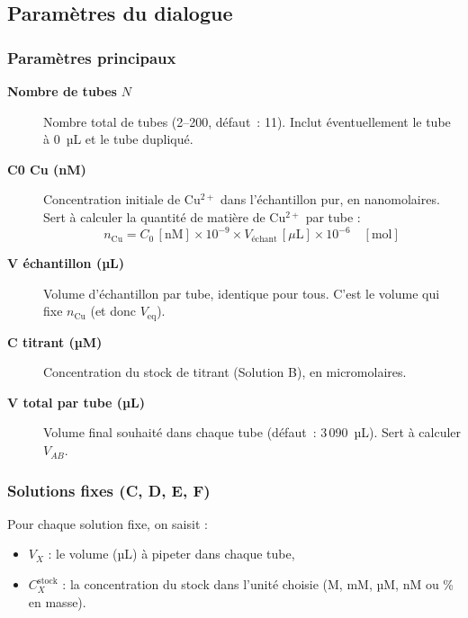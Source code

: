 \documentclass[12pt, a4paper]{article}
\begin{document}
\subsection{Paramètres du dialogue}

\subsubsection{Paramètres principaux}

\begin{description}
  \item[\textbf{Nombre de tubes} $N$] Nombre total de tubes (2--200,
        défaut~: 11). Inclut éventuellement le tube à 0~µL et le tube
        dupliqué.

  \item[\textbf{C0 Cu (nM)}] Concentration initiale de Cu$^{2+}$ dans
        l'échantillon pur, en nanomolaires. Sert à calculer la quantité de
        matière de Cu$^{2+}$ par tube :
        \[
          n_\text{Cu} = C_0\,[\text{nM}] \times 10^{-9} \times
                        V_\text{échant}\,[\mu\text{L}] \times 10^{-6}
                      \quad [\text{mol}]
        \]

  \item[\textbf{V échantillon (µL)}] Volume d'échantillon par tube,
        identique pour tous. C'est le volume qui fixe $n_\text{Cu}$
        (et donc $V_\text{eq}$).

  \item[\textbf{C titrant (µM)}] Concentration du stock de titrant
        (Solution B), en micromolaires.

  \item[\textbf{V total par tube (µL)}] Volume final souhaité dans chaque
        tube (défaut~: 3\,090~µL). Sert à calculer $V_{AB}$.
\end{description}

\subsubsection{Solutions fixes (C, D, E, F)}

Pour chaque solution fixe, on saisit :
\begin{itemize}
  \item $V_X$ : le volume (µL) à pipeter dans chaque tube,
  \item $C_X^\text{stock}$ : la concentration du stock dans l'unité choisie
        (M, mM, µM, nM ou \% en masse).
\end{itemize}
\end{document}
